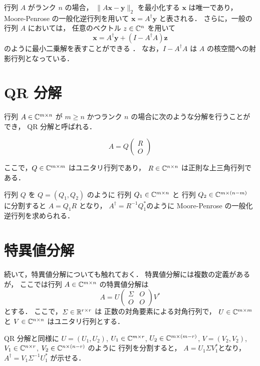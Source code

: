 行列 $A$ がランク $n$ の場合，
$\|A \bm{x} - \bm{y}\|_2$ を最小化する $\bm{x}$ は唯一であり，
Moore-Penrose の一般化逆行列を用いて
$\bm{x} = A^\dagger \bm{y}$ と表される．
さらに，一般の行列 $A$ においては，
任意のベクトル $z \in \mathbb{C}^n$ を用いて
\begin{equation}
    \bm{x} = A^\dagger \bm{y} + (I - A^\dagger A) \bm{z}
    \label{eq:matrix-computation_moore-penrose_general-least-squares-solution}
\end{equation}
のように最小二乗解を表すことができる \cite[定理2.3.1]{Rao1971}．
なお，$I - A^\dagger A$ は $A$ の核空間への射影行列となっている．

\section{QR 分解}

行列 $A \in \mathbb{C}^{m \times n}$ が
$m \ge n$ かつランク $n$ の場合に次のような分解を行うことができ，
QR 分解と呼ばれる．

\begin{equation}
    A = Q
    \begin{pmatrix}
        R \\ O
    \end{pmatrix}
\end{equation}

ここで，$Q \in \mathbb{C}^{m \times m}$ はユニタリ行列であり，
$R \in \mathbb{C}^{n \times n}$ は正則な上三角行列である．

行列 $Q$ を $Q = (Q_1, Q_2)$ のように
行列 $Q_1 \in \mathbb{C}^{m \times n}$ と
行列 $Q_2 \in \mathbb{C}^{m \times (n-m)}$ に分割すると
$A = Q_1 R$ となり，
$A^\dagger = R^{-1} Q_1^*$のように
Moore-Penrose の一般化逆行列を求められる．

\section{特異値分解}

続いて，特異値分解についても触れておく．
特異値分解には複数の定義があるが，
ここでは行列 $A \in \mathbb{C}^{m \times n}$ の特異値分解は
\begin{equation}
    A = U
    \begin{pmatrix}
        \Sigma & O \\
        O      & O
    \end{pmatrix}
    V^*
\end{equation}
とする．
ここで，$\varSigma \in \mathbb{R}^{r \times r}$ は
正数の対角要素による対角行列で，
$U \in \mathbb{C}^{m \times m}$ と
$V \in \mathbb{C}^{n \times n}$ はユニタリ行列とする．

QR 分解と同様に
$U = (U_1, U_2)$,
$U_1 \in \mathbb{C}^{m \times r}$,
$U_2 \in \mathbb{C}^{m \times (m-r)}$,
$V = (V_2, V_2)$,
$V_1 \in \mathbb{C}^{n \times r}$,
$V_2 \in \mathbb{C}^{n \times (n-r)}$ のように
行列を分割すると，
$A = U_1 \Sigma V_1^*$となり，
$A^\dagger = V_1 \Sigma^{-1} U_1^*$ が示せる．
